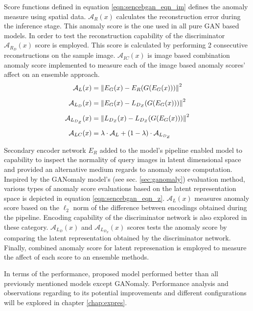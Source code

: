 Score functions defined in equation \ref{eqn:sencebgan_eqn_im} defines the anomaly measure using
spatial data. $\mathcal{A}_{R}(x)$ calculates the reconstruction error during the inference stage.
This anomaly score is the one used in all pure GAN based models. In order to test the reconstruction
capability of the discriminator $\mathcal{A}_{R_{D}}(x)$ score is employed. This score is calculated
by performing 2 consecutive reconstructions on the sample image. $\mathcal{A}_{IC}(x)$ is image
based combination anomaly score implemented to measure each of the image based anomaly scores'
affect on an ensemble approach.
\begin{equation}
	\label{eqn:sencebgan_eqn_z}
	\begin{aligned}
	\mathcal{A}_{L}(x) & = \left\lVert E_{G}(x) - E_{R}(G(E_{G}(x)))\right\rVert^2  \\[5pt]
	\mathcal{A}_{L_{D}}(x) & = \left\lVert E_{G}(x) - L_{D_{Z}}(G(E_{G}(x)))\right\rVert^2 \\[5pt]
	\mathcal{A}_{L_{D_{Z}}}(x) & = \left\lVert L_{D_{Z}}(x) - L_{D_{Z}}(G(E_{G}(x)))\right\rVert^2 \\[5pt]
	\mathcal{A}_{LC}(x) & = \lambda \cdot \mathcal{A}_{L} + (1 - \lambda) \cdot \mathcal{A}_{L_{D_{Z}}} 
	\end{aligned}
\end{equation}

Secondary encoder network $E_{R}$ added to the model's pipeline enabled model to capability to
inspect the normality of query images in latent dimensional space and provided an alternative medium
regards to anomaly score computation. Inspired by the GANomaly model's (see sec. \ref{sec:ganomaly})
evaluation method, various types of anomaly score evaluations based on the latent representation
space is depicted in equation \ref{eqn:sencebgan_eqn_z}. $\mathcal{A}_{L}(x)$ measures anomaly score
based on the $\ell_{2}$ norm of the difference between encodings obtained during the pipeline.
Encoding capability of the discriminator network is also explored in these category.
$\mathcal{A}_{L_{D}}(x)$ and $\mathcal{A}_{L_{D_{Z}}}(x)$ scores tests the anomaly score by
comparing the latent representation obtained by the discriminator network. Finally, combined anomaly
score for latent represenation is employed to measure the affect of each score to an ensemble
methods. 
 
In terms of the performance, proposed model performed better than all previously mentioned models
except GANomaly. Performance analysis and observations regarding to its potential improvements and
different configurations will be explored in chapter \ref{chap:expres}.


\endgroup
